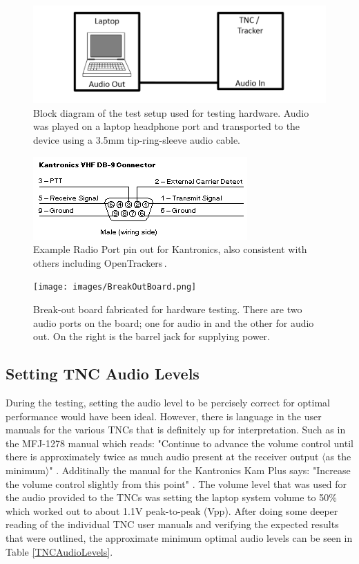 \begin{figure}
  \centering
	\includegraphics[width=0.75\linewidth]{images/TNCLaptopTestSetup.PNG} 
	\caption{Block diagram of the test setup used for testing hardware. Audio was played on a laptop headphone port and transported to the device using a 3.5mm tip-ring-sleeve audio cable.}
   \label{TNCLaptopTestSetup}
\end{figure}
\begin{figure}
  \centering
	\includegraphics[width=0.75\linewidth]{images/RadioPortPinout.png} 
	\caption{Example Radio Port pin out for Kantronics, also consistent with others including OpenTrackers\,\cite{Martin2014}.}
   \label{RadioPortPinout}
\end{figure}
\begin{figure}
  \centering
	\texttt{[image: images/BreakOutBoard.png]} 
	\caption{Break-out board fabricated for hardware testing. There are two audio ports on the board; one for audio in and the other for audio out. On the right is the barrel jack for supplying power.}
   \label{BreakOutBoard}
\end{figure}

\subsection{Setting TNC Audio Levels}
During the testing, setting the audio level to be percisely correct for optimal performance would have been ideal. However, there is language in the user manuals for the various TNCs that is definitely up for interpretation. Such as in the MFJ-1278 manual which reads: "Continue to advance the volume control until there is approximately twice as much audio present at the receiver output $\langle$as the minimum$\rangle$" \cite{MFJ1278Man}. Additinally the manual for the Kantronics Kam Plus says: "Increase the volume control slightly from this point" \cite{KamPlusGettingStarted}. The volume level that was used for the audio provided to the TNCs was setting the laptop system volume to 50\% which worked out to about 1.1V peak-to-peak (Vpp). After doing some deeper reading of the individual TNC user manuals and verifying the expected results that were outlined, the approximate minimum optimal audio levels can be seen in Table \ref{TNCAudioLevels}.

